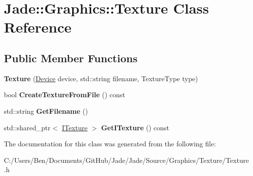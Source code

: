 \hypertarget{class_jade_1_1_graphics_1_1_texture}{}\section{Jade\+:\+:Graphics\+:\+:Texture Class Reference}
\label{class_jade_1_1_graphics_1_1_texture}
\subsection*{Public Member Functions}
\begin{DoxyCompactItemize}
\item 
\hypertarget{class_jade_1_1_graphics_1_1_texture_a59de955b57a5db4845792cef4c9959d9}{}{\bfseries Texture} (\hyperlink{class_jade_1_1_graphics_1_1_device}{Device} device, std\+::string filename, Texture\+Type type)\label{class_jade_1_1_graphics_1_1_texture_a59de955b57a5db4845792cef4c9959d9}

\item 
\hypertarget{class_jade_1_1_graphics_1_1_texture_aba04918ff5aff35169ebfe6fdeac6727}{}bool {\bfseries Create\+Texture\+From\+File} () const \label{class_jade_1_1_graphics_1_1_texture_aba04918ff5aff35169ebfe6fdeac6727}

\item 
\hypertarget{class_jade_1_1_graphics_1_1_texture_a5330c4e0ace59056884388cf8be3c9ee}{}std\+::string {\bfseries Get\+Filename} ()\label{class_jade_1_1_graphics_1_1_texture_a5330c4e0ace59056884388cf8be3c9ee}

\item 
\hypertarget{class_jade_1_1_graphics_1_1_texture_accc5f797f7d2f9cf4c2b4f3b65dc8839}{}std\+::shared\+\_\+ptr$<$ \hyperlink{struct_jade_1_1_graphics_1_1_i_texture}{I\+Texture} $>$ {\bfseries Get\+I\+Texture} () const \label{class_jade_1_1_graphics_1_1_texture_accc5f797f7d2f9cf4c2b4f3b65dc8839}

\end{DoxyCompactItemize}


The documentation for this class was generated from the following file\+:\begin{DoxyCompactItemize}
\item 
C\+:/\+Users/\+Ben/\+Documents/\+Git\+Hub/\+Jade/\+Jade/\+Source/\+Graphics/\+Texture/Texture.\+h\end{DoxyCompactItemize}
